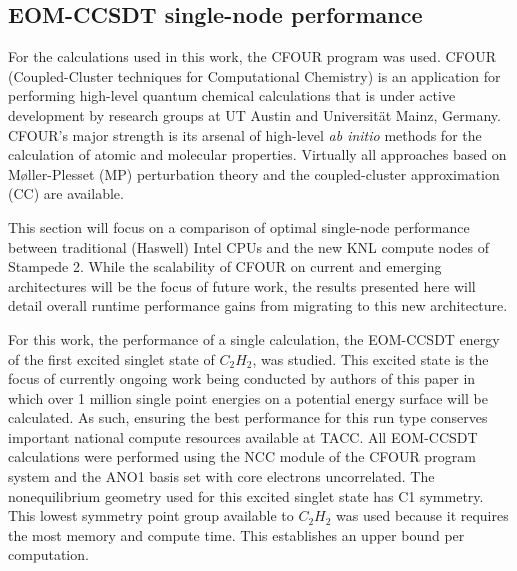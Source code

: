 \subsection{EOM-CCSDT single-node performance}
\label{sec:cfour}

For the calculations used in this work, the CFOUR \cite{cfour:08} program was
used. CFOUR (Coupled-Cluster techniques for Computational Chemistry) is an
application for performing high-level quantum chemical calculations that is
under active development by research groups at UT Austin and Universit\"{a}t
Mainz, Germany. CFOUR's major strength is its arsenal of high-level \emph{ab
initio} methods for the calculation of atomic and molecular properties.
Virtually all approaches based on M\o ller-Plesset (MP) perturbation theory and
the coupled-cluster approximation (CC) are available.

This section will focus on a comparison of optimal single-node performance
between traditional (Haswell) Intel CPUs and the new KNL compute nodes of
Stampede 2.  While the
scalability of CFOUR on current and emerging architectures will be the focus of
future work, the results presented here will detail overall runtime performance
gains from migrating to this new architecture.

For this work, the performance of a single calculation, the EOM-CCSDT energy of the first
excited singlet state of $C_2H_2$, was studied.
This excited state is the focus of currently ongoing work being conducted by authors of this paper
in which over 1 million single point energies on a potential energy surface will be calculated.
As such, ensuring the best performance for this run type conserves important national compute resources
available at TACC.  All EOM-CCSDT calculations were performed
using the NCC module\cite{ncc:15} of the CFOUR program system and the ANO1 basis set\cite{ano1:87} with core
electrons uncorrelated. The nonequilibrium geometry used for this excited singlet state has C1 symmetry.
This lowest symmetry point group available to $C_2H_2$ was used because it requires the most memory
and compute time. This establishes an upper bound per computation.

